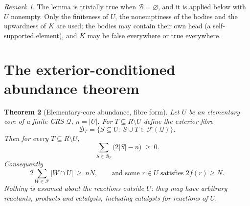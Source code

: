 \documentclass[11pt,a4paper]{article}
\theoremstyle{plain}
\newtheorem{theorem}{Theorem}[section]
\theoremstyle{definition}
\theoremstyle{remark}
\newtheorem{remark}[theorem]{Remark}
\newcommand{\FF}{\mathcal F}
\newcommand{\BB}{\mathcal B}
\newcommand{\QQ}{\mathcal Q}
\begin{document}
\begin{remark}
The lemma is trivially true when $\BB=\varnothing$, and it is applied below with
$U$ nonempty. Only the finiteness of $U$, the nonemptiness of the bodies and the
upwardness of $K$ are used; the bodies may contain their own head (a self-supported
element), and $K$ may be false everywhere or true everywhere.
\end{remark}

\section{The exterior-conditioned abundance theorem}\label{sec:core}

\begin{theorem}[Elementary-core abundance, fibre form]\label{thm:core}
Let $U$ be an elementary core of a finite CRS $\QQ$, $n=|U|$. For $T\subseteq R\setminus U$
define the \emph{exterior fibre}
\[
\BB_T=\{S\subseteq U:\ S\cup T\in\FF(\QQ)\}.
\]
Then for every $T\subseteq R\setminus U$,
\begin{equation}\label{eq:fibre}
\sum_{S\in\BB_T}\bigl(2|S|-n\bigr)\ \ge\ 0 .
\end{equation}
Consequently
\begin{equation}\label{eq:global}
2\sum_{W\in\FF}|W\cap U|\ \ge\ nN,\qquad\text{and some } r\in U \text{ satisfies } 2f(r)\ge N .
\end{equation}
Nothing is assumed about the reactions outside $U$: they may have arbitrary reactants,
products and catalysts, including catalysts for reactions of $U$.
\end{theorem}
\end{document}
